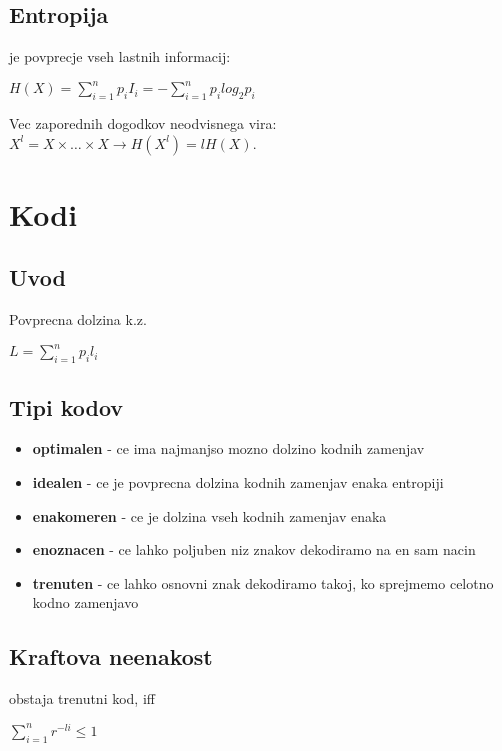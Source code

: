 \documentclass{article}
\begin{document}
\begin{multicols}{4}
\subsection{Entropija}
je povprecje vseh lastnih informacij:
\begin{center}
    \begin{math}
        H(X) = \sum_{i=1}^{n} p_i I_i = -\sum_{i=1}^{n} p_i log_2 p_i
    \end{math}
\end{center}
Vec zaporednih dogodkov neodvisnega vira: $X^l = X \times \dots \times X \rightarrow H(X^l) = lH(X)$.

\section{Kodi}

\subsection{Uvod}
Povprecna dolzina k.z.
\begin{center}
    \begin{math}
        L = \sum_{i=1}^n p_i l_i
    \end{math}
\end{center}

\subsection{Tipi kodov}
\begin{itemize}
    \item \textbf{optimalen} - ce ima najmanjso mozno dolzino kodnih zamenjav
    \item \textbf{idealen} - ce je povprecna dolzina kodnih zamenjav enaka entropiji
    \item \textbf{enakomeren} - ce je dolzina vseh kodnih zamenjav enaka
    \item \textbf{enoznacen} - ce lahko poljuben niz znakov dekodiramo na en sam nacin
    \item \textbf{trenuten} - ce lahko osnovni znak dekodiramo takoj, ko sprejmemo celotno kodno zamenjavo
\end{itemize}

\subsection{Kraftova neenakost}
obstaja trenutni kod, iff
\begin{center}
    \begin{math}
        \sum_{i=1}^n r^{-li} \leq 1
    \end{math}
\end{center}


\end{multicols}
\end{document}
